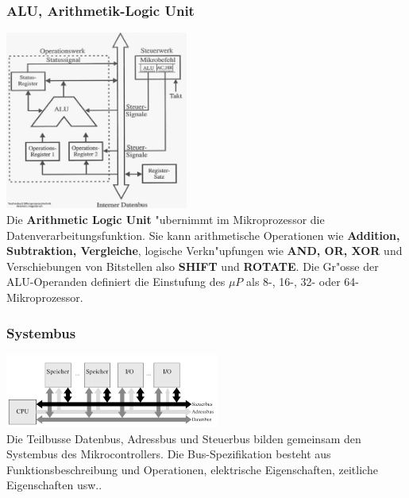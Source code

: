 \begin{minipage}[t]{9cm}
	\subsubsection{ALU, Arithmetik-Logic Unit}
	\includegraphics[width=6cm]{pics/ALU}\\
	Die \textbf{Arithmetic Logic Unit} "ubernimmt im Mikroprozessor die Datenverarbeitungsfunktion. Sie kann arithmetische Operationen wie \textbf{Addition, Subtraktion, Vergleiche}, logische Verkn"upfungen wie \textbf{AND, OR, XOR} und Verschiebungen von Bitstellen also \textbf{SHIFT} und \textbf{ROTATE}. Die Gr"osse der ALU-Operanden definiert die Einstufung des $\mu P$ als 8-, 16-, 32- oder 64-Mikroprozessor.
	
	\subsubsection{Systembus}
	\includegraphics[width=7cm]{pics/Systembus}\\
	Die Teilbusse Datenbus, Adressbus und Steuerbus bilden gemeinsam den Systembus des Mikrocontrollers. Die Bus-Spezifikation besteht aus Funktionsbeschreibung und Operationen, elektrische Eigenschaften, zeitliche Eigenschaften usw..

\end{minipage}
%
\begin{minipage}{0.5cm}
	\ \
\end{minipage}
%

